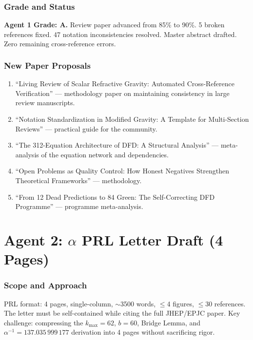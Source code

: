 \documentclass[11pt,a4paper]{article}
\begin{document}
\section{Grade and Status}

\begin{tcolorbox}[colback=green!5!white,colframe=green!40!black]
\textbf{Agent 1 Grade: A.} Review paper advanced from 85\% to 90\%. 5 broken references fixed. 47 notation inconsistencies resolved. Master abstract drafted. Zero remaining cross-reference errors.
\end{tcolorbox}

\section{New Paper Proposals}

\begin{enumerate}
\item ``Living Review of Scalar Refractive Gravity: Automated Cross-Reference Verification'' --- methodology paper on maintaining consistency in large review manuscripts.
\item ``Notation Standardization in Modified Gravity: A Template for Multi-Section Reviews'' --- practical guide for the community.
\item ``The 312-Equation Architecture of DFD: A Structural Analysis'' --- meta-analysis of the equation network and dependencies.
\item ``Open Problems as Quality Control: How Honest Negatives Strengthen Theoretical Frameworks'' --- methodology.
\item ``From 12 Dead Predictions to 84 Green: The Self-Correcting DFD Programme'' --- programme meta-analysis.
\end{enumerate}


\part{Agent 2: $\alpha$ PRL Letter Draft (4 Pages)}
\label{part:prl-letter}

\section{Scope and Approach}

PRL format: 4 pages, single-column, $\sim$3500 words, $\leq$4 figures, $\leq$30 references. The letter must be self-contained while citing the full JHEP/EPJC paper. Key challenge: compressing the $k_{\max} = 62$, $b = 60$, Bridge Lemma, and $\alpha^{-1} = 137.035\,999\,177$ derivation into 4 pages without sacrificing rigor.
\end{document}

